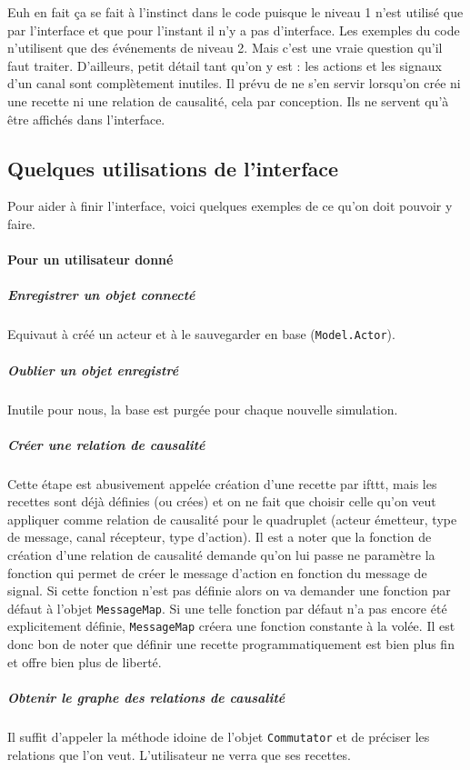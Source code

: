 \documentclass[11pt]{article}
\begin{document}
Euh en fait ça se fait à l'instinct dans le code puisque le niveau 1 n'est utilisé que par l'interface et que pour l'instant il n'y a pas d'interface. Les exemples du code n'utilisent que des événements de niveau 2. Mais c'est une vraie question qu'il faut traiter. D'ailleurs, petit détail tant qu'on y est : les actions et les signaux d'un canal sont complètement inutiles. Il prévu de ne s'en servir lorsqu'on crée ni une recette ni une relation de causalité, cela par conception. Ils ne servent qu'à être affichés dans l'interface.

\subsection{Quelques utilisations de l'interface}

Pour aider à finir l'interface, voici quelques exemples de ce qu'on doit pouvoir y faire.

\paragraph{Pour un utilisateur donné}

\subparagraph{Enregistrer un objet connecté} Equivaut à créé un acteur et à le sauvegarder en base (\texttt{Model.Actor}).

\subparagraph{Oublier un objet enregistré} Inutile pour nous, la base est purgée pour chaque nouvelle simulation.

\subparagraph{Créer une relation de causalité} Cette étape est abusivement appelée création d'une recette par ifttt, mais les recettes sont déjà définies (ou crées) et on ne fait que choisir celle qu'on veut appliquer comme relation de causalité pour le quadruplet (acteur émetteur, type de message, canal récepteur, type d'action). Il est a noter que la fonction de création d'une relation de causalité demande qu'on lui passe ne paramètre la fonction qui permet de créer le message d'action en fonction du message de signal. Si cette fonction n'est pas définie alors on va demander une fonction par défaut à l'objet \texttt{MessageMap}. Si une telle fonction par défaut n'a pas encore été explicitement définie, \texttt{MessageMap} créera une fonction constante à la volée. Il est donc bon de noter que définir une recette programmatiquement est bien plus fin et offre bien plus de liberté.

\subparagraph{Obtenir le graphe des relations de causalité} Il suffit d'appeler la méthode idoine de l'objet \texttt{Commutator} et de préciser les relations que l'on veut. L'utilisateur ne verra que ses recettes.
\end{document}

